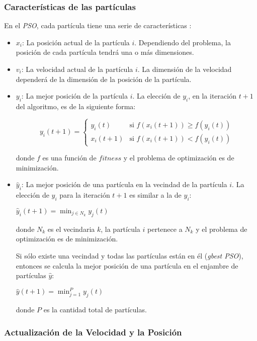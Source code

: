 \subsubsection{Características de las partículas}

    En el \emph{PSO}, cada partícula tiene una serie de características
\cite{PSO_0}:
\begin{itemize}
    \item $x_i$: La posición actual de la partícula $i$. Dependiendo del
problema, la posición de cada partícula tendrá una o más dimensiones.
    \item $v_i$: La velocidad actual de la partícula $i$. La dimensión de la
velocidad dependerá de la dimensión de la posición de la partícula.
    \item $y_i$: La mejor posición de la partícula $i$. La elección de $y_i$, en
la iteración $t + 1$ del algoritmo, es de la siguiente forma:
\begin{center}
    \[
      y_i(t+1) =
      \begin{cases}
        y_i(t)   & \text{si } f(x_i(t+1)) \geq f(y_i(t)) \\
        x_i(t+1) & \text{si } f(x_i(t+1)) < f(y_i(t))
      \end{cases}
    \]
\end{center}
donde $f$ es una función de $fitness$ y el problema de optimización es de
minimización.
    \item $\hat{y}_i$: La mejor posición de una partícula en la vecindad de la
partícula $i$. La elección de $\hat{y}_i$ para la iteración $t + 1$ es similar a
la de $y_i$:
\begin{center}
    $\hat{y}_i(t + 1) = \displaystyle\min_{j \in N_k} y_j(t)$
\end{center}
donde $N_k$ es el vecindaria $k$, la partícula $i$ pertenece a $N_k$ y el
problema de optimización es de minimización.

    Si sólo existe una vecindad y todas las partículas están en él
(\emph{gbest PSO}), entonces se calcula la mejor posición de una partícula en el
enjambre de partículas $\hat{y}$:
\begin{center}
    $\hat{y}(t + 1) = \displaystyle\min_{j = 1}^{P} y_j(t)$
\end{center}
donde $P$ es la cantidad total de partículas.
\end{itemize}

\subsubsection{Actualización de la Velocidad y la Posición}

